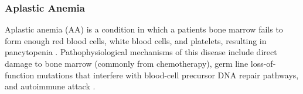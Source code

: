 \documentclass{article}
\begin{document}
\subsubsection{Aplastic Anemia}
Aplastic anemia (AA) is a condition in which a patient\textquotesingle s bone marrow fails to form enough red blood cells, white blood cells, and platelets, resulting in pancytopenia \citep{young_aplastic_2018}.
Pathophysiological mechanisms of this disease include direct damage to bone marrow (commonly from chemotherapy), germ line loss-of-function mutations that interfere with blood-cell precursor DNA repair pathways, and autoimmune attack \citep{young_aplastic_2018}. 

\end{document}

